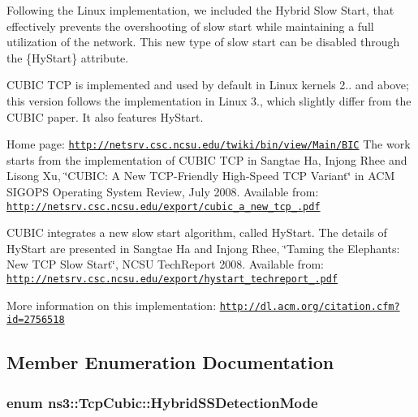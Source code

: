 Following the Linux implementation, we included the Hybrid Slow Start, that effectively prevents the overshooting of slow start while maintaining a full utilization of the network. This new type of slow start can be disabled through the \{Hy\+Start\} attribute.

C\+U\+B\+IC T\+CP is implemented and used by default in Linux kernels 2.. and above; this version follows the implementation in Linux 3., which slightly differ from the C\+U\+B\+IC paper. It also features Hy\+Start.

Home page\+: \href{http://netsrv.csc.ncsu.edu/twiki/bin/view/Main/BIC}{\tt http\+://netsrv.\+csc.\+ncsu.\+edu/twiki/bin/view/\+Main/\+B\+IC} The work starts from the implementation of C\+U\+B\+IC T\+CP in Sangtae Ha, Injong Rhee and Lisong Xu, \char`\"{}\+C\+U\+B\+I\+C\+: A New T\+C\+P-\/\+Friendly High-\/\+Speed T\+C\+P Variant\char`\"{} in A\+CM S\+I\+G\+O\+PS Operating System Review, July 2008. Available from\+: \href{http://netsrv.csc.ncsu.edu/export/cubic_a_new_tcp_2008.pdf}{\tt http\+://netsrv.\+csc.\+ncsu.\+edu/export/cubic\+\_\+a\+\_\+new\+\_\+tcp\+\_.\+pdf}

C\+U\+B\+IC integrates a new slow start algorithm, called Hy\+Start. The details of Hy\+Start are presented in Sangtae Ha and Injong Rhee, \char`\"{}\+Taming the Elephants\+: New T\+C\+P Slow Start\char`\"{}, N\+C\+SU Tech\+Report 2008. Available from\+: \href{http://netsrv.csc.ncsu.edu/export/hystart_techreport_2008.pdf}{\tt http\+://netsrv.\+csc.\+ncsu.\+edu/export/hystart\+\_\+techreport\+\_.\+pdf}

More information on this implementation\+: \href{http://dl.acm.org/citation.cfm?id=2756518}{\tt http\+://dl.\+acm.\+org/citation.\+cfm?id=2756518} 

\subsection{Member Enumeration Documentation}
\subsubsection[{\texorpdfstring{Hybrid\+S\+S\+Detection\+Mode}{HybridSSDetectionMode}}]{\setlength{\rightskip}{0pt plus 5cm}enum {\bf ns3\+::\+Tcp\+Cubic\+::\+Hybrid\+S\+S\+Detection\+Mode}\hspace{0.3cm}{\ttfamily [private]}}\hypertarget{classns3_1_1TcpCubic_adc8acf4d99d45daa4bff0c47dc9aa707}{}\label{classns3_1_1TcpCubic_adc8acf4d99d45daa4bff0c47dc9aa707}


